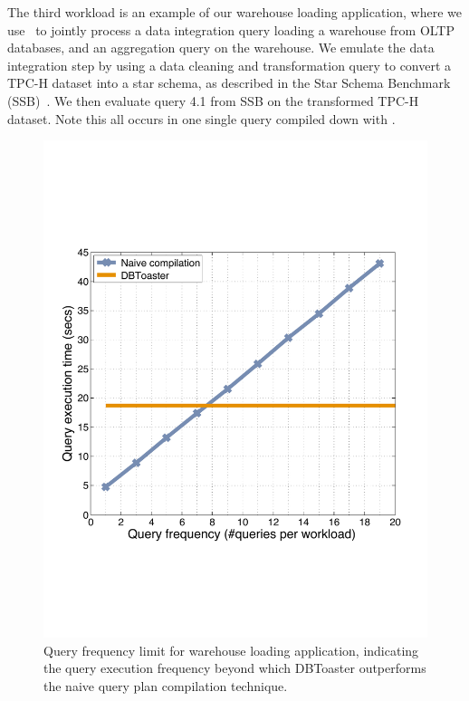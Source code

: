 The third workload is an example of our warehouse loading application, where we
use \compiler\ to jointly process a data integration query loading a warehouse
from OLTP databases, and an aggregation query on the warehouse. We emulate the
data integration step by using a data cleaning and transformation query to
convert a TPC-H dataset into a star schema, as described in the Star Schema
Benchmark (SSB)~\cite{poneil-ssb:07}. We then evaluate query 4.1 from SSB on the
transformed TPC-H dataset. Note this all occurs in one single query compiled down
with \compiler.


\begin{figure}[tb]
\begin{center}
\includegraphics[scale=0.25]{../plots/ssb_query_freq_dn}
\end{center}
\vspace{-4mm}
\caption{Query frequency limit for warehouse loading application, indicating the
query execution frequency beyond which DBToaster outperforms the naive query
plan compilation technique.}
\label{fig:ssb_query_freq}
\end{figure}



